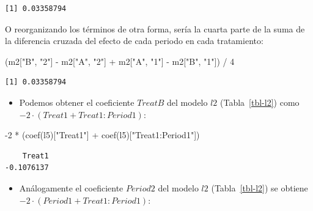 \documentclass[
  12pt,
  a4paper,
  extrafontsizes,
  onecolumn,
  openright]{memoir}
\newenvironment{Shaded}{\begin{snugshade}}{\end{snugshade}}
\newcommand{\DecValTok}[1]{\textcolor[rgb]{0.68,0.00,0.00}{#1}}
\newcommand{\FunctionTok}[1]{\textcolor[rgb]{0.28,0.35,0.67}{#1}}
\newcommand{\NormalTok}[1]{\textcolor[rgb]{0.00,0.23,0.31}{#1}}
\newcommand{\SpecialCharTok}[1]{\textcolor[rgb]{0.37,0.37,0.37}{#1}}
\newcommand{\StringTok}[1]{\textcolor[rgb]{0.13,0.47,0.30}{#1}}
\providecommand{\tightlist}{%
  \setlength{\itemsep}{0pt}\setlength{\parskip}{0pt}}\usepackage{longtable,booktabs,array}
\begin{document}
\begin{verbatim}
[1] 0.03358794
\end{verbatim}

\normalsize

O reorganizando los términos de otra forma, sería la cuarta parte de la
suma de la diferencia cruzada del efecto de cada periodo en cada
tratamiento:

\scriptsize

\begin{Shaded}
\begin{Highlighting}[]
\NormalTok{(m2[}\StringTok{"B"}\NormalTok{, }\StringTok{"2"}\NormalTok{] }\SpecialCharTok{{-}}\NormalTok{ m2[}\StringTok{"A"}\NormalTok{, }\StringTok{"2"}\NormalTok{] }\SpecialCharTok{+}\NormalTok{ m2[}\StringTok{"A"}\NormalTok{, }\StringTok{"1"}\NormalTok{] }\SpecialCharTok{{-}}\NormalTok{ m2[}\StringTok{"B"}\NormalTok{, }\StringTok{"1"}\NormalTok{]) }\SpecialCharTok{/} \DecValTok{4}
\end{Highlighting}
\end{Shaded}

\begin{verbatim}
[1] 0.03358794
\end{verbatim}

\normalsize

\begin{itemize}
\tightlist
\item
  Podemos obtener el coeficiente \(TreatB\) del modelo \(l2\)
  (Tabla~\ref{tbl-l2}) como \(-2 \cdot (Treat1 + Treat1:Period1)\):
\end{itemize}

\scriptsize

\begin{Shaded}
\begin{Highlighting}[]
\SpecialCharTok{{-}}\DecValTok{2} \SpecialCharTok{*}\NormalTok{ (}\FunctionTok{coef}\NormalTok{(l5)[}\StringTok{"Treat1"}\NormalTok{] }\SpecialCharTok{+} \FunctionTok{coef}\NormalTok{(l5)[}\StringTok{"Treat1:Period1"}\NormalTok{])}
\end{Highlighting}
\end{Shaded}

\begin{verbatim}
    Treat1 
-0.1076137 
\end{verbatim}

\normalsize

\begin{itemize}
\tightlist
\item
  Análogamente el coeficiente \(Period2\) del modelo \(l2\)
  (Tabla~\ref{tbl-l2}) se obtiene
  \(-2 \cdot (Period1 + Treat1:Period1)\):
\end{itemize}
\end{document}
